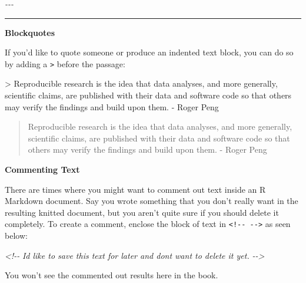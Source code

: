 \documentclass[]{tufte-book}
\newenvironment{Shaded}{\begin{snugshade}}{\end{snugshade}}
\newcommand{\AttributeTok}[1]{\textcolor[rgb]{0.13,0.29,0.53}{#1}}
\newcommand{\CommentTok}[1]{\textcolor[rgb]{0.56,0.35,0.01}{\textit{#1}}}
\begin{document}
\begin{Shaded}
\begin{Highlighting}[]
\CommentTok{{-}{-}{-}}
\end{Highlighting}
\end{Shaded}

\begin{center}\rule{0.5\linewidth}{0.5pt}\end{center}

\textbf{Blockquotes}

If you'd like to quote someone or produce an indented text block, you can do so by adding a \texttt{\textgreater{}} before the passage:

\begin{Shaded}
\begin{Highlighting}[]
\AttributeTok{\textgreater{} Reproducible research is the idea that data analyses, and more generally,}
\AttributeTok{scientific claims, are published with their data and software code so that}
\AttributeTok{others may verify the findings and build upon them. {-} Roger Peng}
\end{Highlighting}
\end{Shaded}

\begin{quote}
Reproducible research is the idea that data analyses, and more generally, scientific claims, are published with their data and software code so that others may verify the findings and build upon them. - Roger Peng
\end{quote}

\textbf{Commenting Text}

There are times where you might want to comment out text inside an R Markdown document. Say you wrote something that you don't really want in the resulting knitted document, but you aren't quite sure if you should delete it completely. To create a comment, enclose the block of text in \texttt{\textless{}!-\/-\ -\/-\textgreater{}} as seen below:

\begin{Shaded}
\begin{Highlighting}[]
\CommentTok{\textless{}!{-}{-}}
\CommentTok{I\textquotesingle{}d like to save this text for later and don\textquotesingle{}t want to delete it yet.}
\CommentTok{{-}{-}\textgreater{}}
\end{Highlighting}
\end{Shaded}

You won't see the commented out results here in the book.
\end{document}
